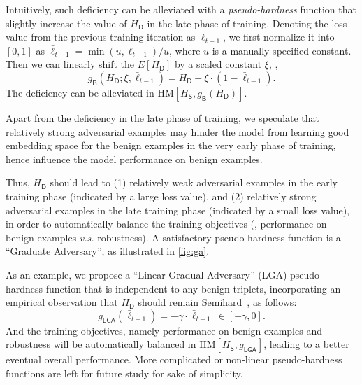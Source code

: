 \documentclass[10pt,twocolumn,letterpaper]{article}
\begin{document}
Intuitively, such deficiency can be alleviated with a \emph{pseudo-hardness}
function that slightly increase the value of $H_\mathsf{D}$ in the late phase
of training.
%
Denoting the loss value from the previous training iteration as $\ell_{t-1}$,
we first normalize it into $[0,1]$ as $\bar{\ell}_{t-1}=\min(u,\ell_{t-1})/u$,
where $u$ is a manually specified constant.
%
Then we can linearly shift the $E[H_\mathsf{D}]$ by a scaled constant $\xi$,
\ie,
%
\begin{equation}
	g_\mathsf{B}(H_\mathsf{D};\xi,\bar{\ell}_{t-1}) =
	H_\mathsf{D} + \xi \cdot (1-\bar{\ell}_{t-1}).
\end{equation}
%
The deficiency can be alleviated in
$\text{HM}[H_\mathsf{S},g_\mathsf{B}(H_\mathsf{D})]$.



Apart from the deficiency in the late phase of training, we speculate that
relatively strong adversarial examples may hinder the model from 
learning good embedding space for the benign examples in the very early phase
of training, hence influence the model performance on benign examples.


Thus, $H_\mathsf{D}$ should lead to (1) relatively weak adversarial examples in
the early training phase (indicated by a large loss value), and (2) relatively
strong adversarial examples in the late training phase (indicated by a small
loss value),
%
in order to automatically balance the training objectives (\ie, performance on
benign examples \emph{v.s.} robustness).
%
A satisfactory pseudo-hardness function is a ``Graduate Adversary'', as
illustrated in \cref{fig:ga}.


As an example, we propose a ``Linear Gradual Adversary'' (LGA) pseudo-hardness
function that is independent to any benign triplets, incorporating an empirical
observation that $H_\mathsf{D}$ should remain Semihard~\cite{facenet}, as
follows:
%
\begin{equation}
	g_\mathsf{LGA}(\bar{\ell}_{t-1}) = -\gamma \cdot \bar{\ell}_{t-1} ~ \in
	[-\gamma,0].
\end{equation}
%
And the training objectives, namely performance on benign examples and
robustness will be automatically balanced in
$\text{HM}[H_\mathsf{S},g_\mathsf{LGA}]$, leading to a better eventual overall
performance.
%
More complicated or non-linear pseudo-hardness functions are left for future study
for sake of simplicity.
%
\end{document}
